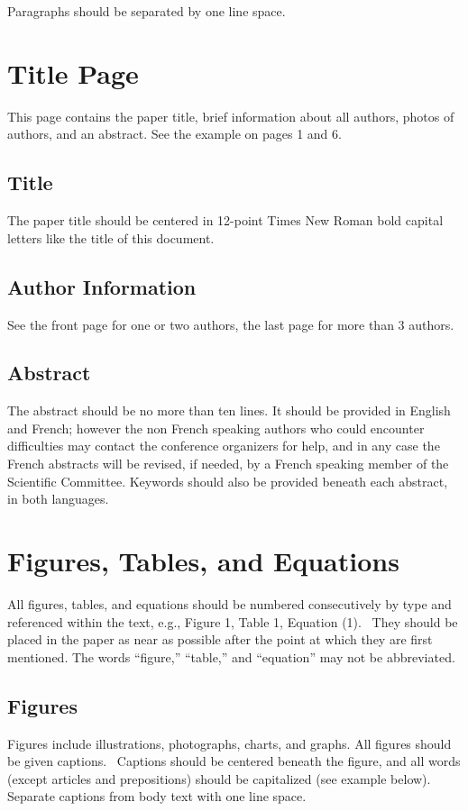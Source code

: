 \documentclass[a4paper]{article}
\begin{document}
{
Paragraphs should be separated by one line space. }

\section{Title Page}
{
This page contains the paper title, brief information about all authors,
photos of authors, and an abstract. See the example on pages 1 and 6.}

\subsection{Title}
{
The paper title should be centered in 12-point Times New Roman bold
capital letters like the title of this document.}

\subsection{Author Information}
{
See the front page for one or two authors, the last page for more than 3
authors.}

\subsection{Abstract}
{
The abstract should be no more than ten lines. It should be provided in
English and French; however the non French speaking authors who could
encounter difficulties may contact the conference organizers for help,
and in any case the French abstracts will be revised, if needed, by a
French speaking member of the Scientific Committee. Keywords should
also be provided beneath each abstract, in both languages.}

\section{Figures, Tables, and Equations}
{
All figures, tables, and equations should be numbered consecutively by
type and referenced within the text, e.g., Figure 1, Table 1, Equation
(1). \ They should be placed in the paper as near as possible after the
point at which they are first mentioned. The words “figure,” “table,”
and “equation” may not be abbreviated.}

\subsection{Figures}
{
Figures include illustrations, photographs, charts, and graphs. All
figures should be given captions. \ Captions should be centered beneath
the figure, and all words (except articles and prepositions) should be
capitalized (see example below). Separate captions from body text with
one line space. }
\end{document}
